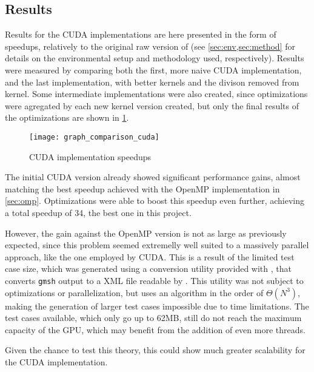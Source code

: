 \subsection{Results}
\label{subsec:cuda:results}


Results for the CUDA implementations are here presented in the form of speedups, relatively to the original raw version of \polu (see \cref{sec:env,sec:method} for details on the environmental setup and methodology used, respectively).
Results were measured by comparing both the first, more naive CUDA implementation, and the last implementation, with better kernels and the divison removed from \update kernel.
Some intermediate implementations were also created, since optimizations were agregated by each new kernel version created, but only the final results of the optimizations are shown in \cref{fig:cuda:results}.

\begin{figure}[!htp]
	\centering
	\texttt{[image: graph\_comparison\_cuda]}
	\caption{CUDA implementation speedups}
	\label{fig:cuda:results}
\end{figure}

The initial CUDA version already showed significant performance gains, almost matching the best speedup achieved with the OpenMP implementation in \cref{sec:omp}.
Optimizations were able to boost this speedup even further, achieving a total speedup of 34, the best one in this project.

However, the gain against the OpenMP version is not as large as previously expected, since this problem seemed extremelly well suited to a massively parallel approach, like the one employed by CUDA.
This is a result of the limited test case size, which was generated using a conversion utility provided with \polu, that converts \texttt{gmsh} output to a XML file readable by \polu.
This utility was not subject to optimizations or parallelization, but uses an algorithm in the order of $\Theta(N^3)$, making the generation of larger test cases impossible due to time limitations.
The test cases available, which only go up to 62MB, still do not reach the maximum capacity of the GPU, which may benefit from the addition of even more threads.

Given the chance to test this theory, this could show much greater scalability for the CUDA implementation.
